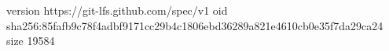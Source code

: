 version https://git-lfs.github.com/spec/v1
oid sha256:85fafb9c78f4adbf9171cc29b4c1806ebd36289a821e4610cb0e35f7da29ca24
size 19584
